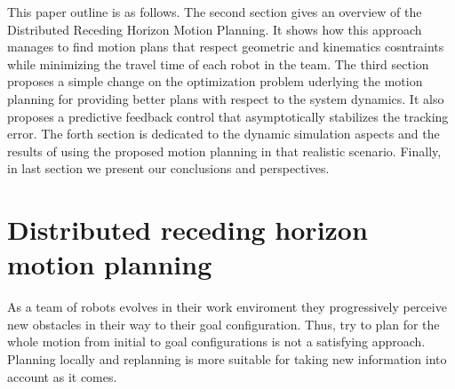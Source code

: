 \documentclass[letterpaper, 10 pt, conference]{ieeeconf}  %
\begin{document}


This paper outline is as follows. The second section gives an overview of the Distributed Receding Horizon Motion Planning. It shows how this approach manages to find motion plans that respect geometric and kinematics cosntraints while minimizing the travel time of each robot in the team. The third section proposes a simple change on the optimization problem uderlying the motion planning for providing better plans with respect to the system dynamics. It also proposes a predictive feedback control that asymptotically stabilizes the tracking error. The forth section is dedicated to the dynamic simulation aspects and the results of using the proposed motion planning in that realistic scenario.
Finally, in last section we present our conclusions and perspectives.


\section{Distributed receding horizon motion planning}

As a team of robots evolves in their work enviroment they progressively perceive new obstacles in their way to their goal configuration. Thus, try to plan for the whole motion from initial to goal configurations is not a satisfying approach. Planning locally and replanning is more suitable for taking new information into account as it comes.
\end{document}
